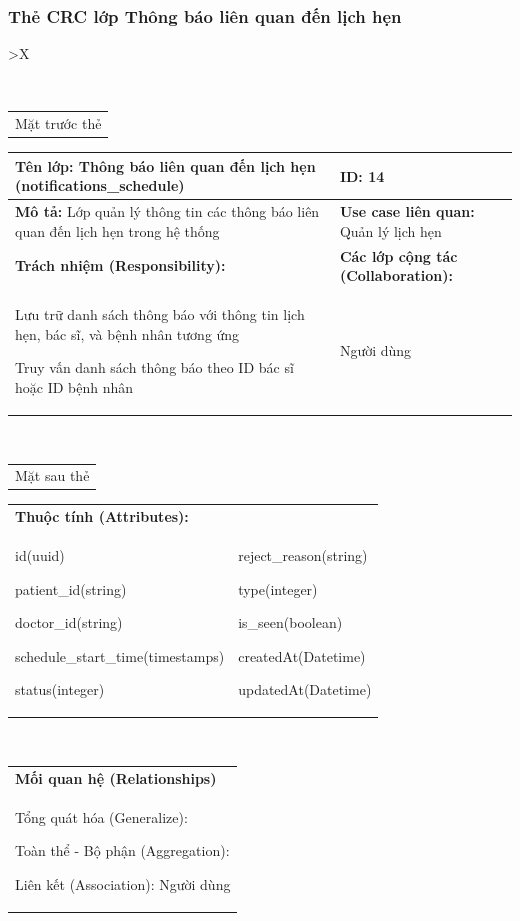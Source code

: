 \subsubsection{Thẻ CRC lớp Thông báo liên quan đến lịch hẹn}

\begin{xltabular}{\textwidth}{
		>{\centering\arraybackslash}X
	}
	\caption{\bfseries \fontsize{12pt}{0pt}\selectfont Thẻ CRC lớp Thông báo liên quan đến lịch hẹn}
	\\
	\begin{tabularx}{0.9\textwidth}{X}
		Mặt trước thẻ
	\end{tabularx}
	\begin{tabularx}{0.9\textwidth}{|X|X|}
		\hline
		\textbf{Tên lớp:} Thông báo liên quan đến lịch hẹn (notifications\_schedule)              & \textbf{ID:} 14                                \\
		\hline
		\textbf{Mô tả:} Lớp quản lý thông tin các thông báo liên quan đến lịch hẹn trong hệ thống & \textbf{Use case liên quan:}  Quản lý lịch hẹn \\
		\hline
		\textbf{Trách nhiệm (Responsibility):}                                                    & \textbf{Các lớp cộng tác (Collaboration):}     \\
		Lưu trữ danh sách thông báo với thông tin lịch hẹn, bác sĩ, và bệnh nhân tương ứng

		Truy vấn danh sách thông báo theo ID bác sĩ hoặc ID bệnh nhân
		                                                                                          &
		Người dùng
		\\
		\hline
	\end{tabularx}
	\\
	\begin{tabularx}{0.9\textwidth}{X}
		Mặt sau thẻ
	\end{tabularx}
	\begin{tabularx}{0.9\textwidth}{|X|X|}
		\hline
		\textbf{Thuộc tính (Attributes):} & \\
		id(uuid)

		patient\_id(string)

		doctor\_id(string)

		schedule\_start\_time(timestamps)

		status(integer)
		                                  &
		reject\_reason(string)

		type(integer)

		is\_seen(boolean)

		createdAt(Datetime)

		updatedAt(Datetime)
		\\ \hline
	\end{tabularx}
	\\
	\begin{tabularx}{0.9\textwidth}{|X|}
		\hline
		\textbf{Mối quan hệ (Relationships)} \\
		Tổng quát hóa (Generalize):

		Toàn thể - Bộ phận (Aggregation):

		Liên kết (Association): Người dùng
		\\
		\hline
	\end{tabularx}
\end{xltabular}

